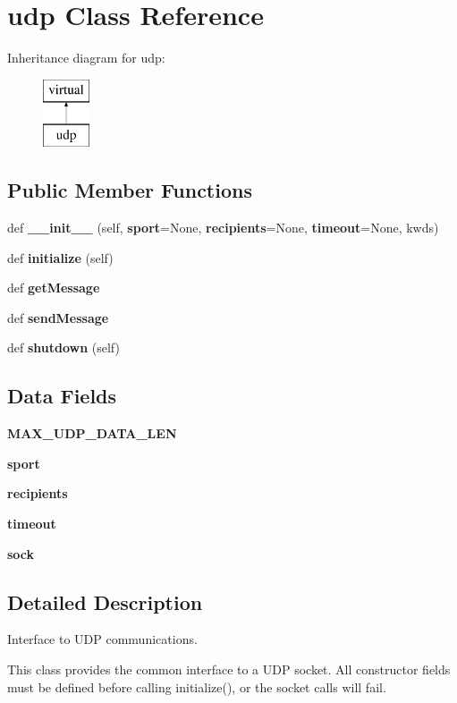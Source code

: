 \section{udp Class Reference}
\label{classprotolibs_1_1ifaces_1_1udp}
Inheritance diagram for udp\+:\begin{figure}[H]
\begin{center}
\leavevmode
\includegraphics[height=2.000000cm]{classprotolibs_1_1ifaces_1_1udp}
\end{center}
\end{figure}
\subsection*{Public Member Functions}
\begin{DoxyCompactItemize}
\item 
def {\bf \+\_\+\+\_\+init\+\_\+\+\_\+} (self, {\bf sport}=None, {\bf recipients}=None, {\bf timeout}=None, kwds)
\item 
def {\bf initialize} (self)
\item 
def {\bf get\+Message}
\item 
def {\bf send\+Message}
\item 
def {\bf shutdown} (self)
\end{DoxyCompactItemize}
\subsection*{Data Fields}
\begin{DoxyCompactItemize}
\item 
{\bf M\+A\+X\+\_\+\+U\+D\+P\+\_\+\+D\+A\+T\+A\+\_\+\+L\+E\+N}
\item 
{\bf sport}
\item 
{\bf recipients}
\item 
{\bf timeout}
\item 
{\bf sock}
\end{DoxyCompactItemize}


\subsection{Detailed Description}
\begin{DoxyVerb}Interface to UDP communications.

This class provides the common interface to a UDP socket. All constructor
fields must be defined before calling initialize(), or the socket calls will
fail.\end{DoxyVerb}
 


